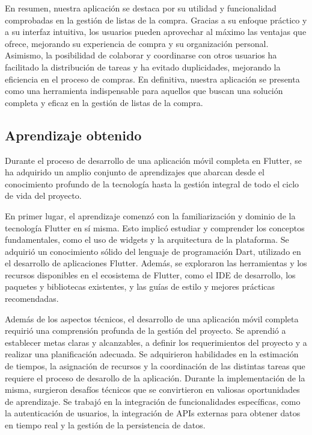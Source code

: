 \documentclass{article}
\begin{document}
En resumen, nuestra aplicación se destaca por su utilidad y funcionalidad comprobadas en la gestión de listas de la compra. Gracias a su enfoque práctico y a su interfaz intuitiva, los usuarios pueden aprovechar al máximo las ventajas que ofrece, mejorando su experiencia de compra y su organización personal. Asimismo, la posibilidad de colaborar y coordinarse con otros usuarios ha facilitado la distribución de tareas y ha evitado duplicidades, mejorando la eficiencia en el proceso de compras. En definitiva, nuestra aplicación se presenta como una herramienta indispensable para aquellos que buscan una solución completa y eficaz en la gestión de listas de la compra.

\subsection{Aprendizaje obtenido}

Durante el proceso de desarrollo de una aplicación móvil completa en Flutter, se ha adquirido un amplio conjunto de aprendizajes que abarcan desde el conocimiento profundo de la tecnología hasta la gestión integral de todo el ciclo de vida del proyecto. 

En primer lugar, el aprendizaje comenzó con la familiarización y dominio de la tecnología Flutter en sí misma. Esto implicó estudiar y comprender los conceptos fundamentales, como el uso de widgets y la arquitectura de la plataforma. Se adquirió un conocimiento sólido del lenguaje de programación Dart, utilizado en el desarrollo de aplicaciones Flutter. Además, se exploraron las herramientas y los recursos disponibles en el ecosistema de Flutter, como el IDE de desarrollo, los paquetes y bibliotecas existentes, y las guías de estilo y mejores prácticas recomendadas.

Además de los aspectos técnicos, el desarrollo de una aplicación móvil completa requirió una comprensión profunda de la gestión del proyecto. Se aprendió a establecer metas claras y alcanzables, a definir los requerimientos del proyecto y a realizar una planificación adecuada. Se adquirieron habilidades en la estimación de tiempos, la asignación de recursos y la coordinación de las distintas tareas que requiere el proceso de desarollo de la aplicación. Durante la implementación de la misma, surgieron desafíos técnicos que se convirtieron en valiosas oportunidades de aprendizaje. Se trabajó en la integración de funcionalidades específicas, como la autenticación de usuarios, la integración de APIs externas para obtener datos en tiempo real y la gestión de la persistencia de datos. 
\end{document}
